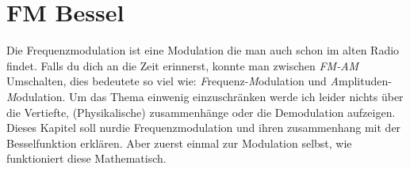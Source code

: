 %
%
% 

\chapter{FM Bessel\label{chapter:fm}}
\begin{refsection}


Die Frequenzmodulation ist eine Modulation die man auch schon im alten Radio findet. 
Falls du dich an die Zeit erinnerst, konnte man zwischen \textit{FM-AM} Umschalten, 
dies bedeutete so viel wie: \textit{F}requenz-\textit{M}odulation und \textit{A}mplituden-\textit{M}odulation.
Um das Thema einwenig einzuschränken werde ich leider nichts über die Vertiefte, (Physikalische) zusammenhänge oder die Demodulation aufzeigen. 
Dieses Kapitel soll nurdie Frequenzmodulation und ihren zusammenhang mit der Besselfunktion erklären.
Aber zuerst einmal zur Modulation selbst, wie funktioniert diese Mathematisch.








\printbibliography[heading=subbibliography]
\end{refsection}


